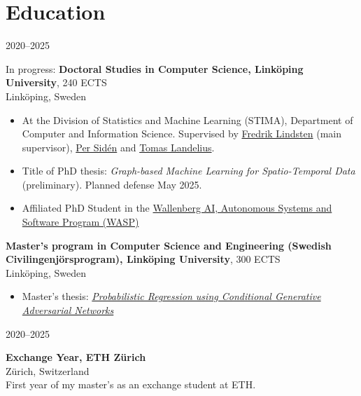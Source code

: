 \section*{Education}
\begin{labeling}{2020--2025}
    \item [2020--2025] In progress: \textbf{Doctoral Studies in Computer Science, Linköping University}, 240 ECTS\\
        {\footnotesize Linköping, Sweden}
        \begin{itemize}
            \item At the Division of Statistics and Machine Learning (STIMA), Department of Computer and Information Science. Supervised by \href{https://lindsten.netlify.app/}{Fredrik Lindsten} (main supervisor), \href{https://scholar.google.se/citations?user=0UomzRIAAAAJ}{Per Sidén} and \href{https://www.smhi.se/en/research/research-departments/meteorology/tomas-landelius-1.4817}{Tomas Landelius}.
            \item Title of PhD thesis: \textit{Graph-based Machine Learning for Spatio-Temporal Data} (preliminary).
            Planned defense May 2025.
            \item Affiliated PhD Student in the \href{https://wasp-sweden.org/}{Wallenberg AI, Autonomous Systems and Software Program (WASP)}
        \end{itemize}
    \item [2015--2020]
            \textbf{Master's program in Computer Science and Engineering (Swedish Civilingenjörsprogram), Linköping University}, 300 ECTS\\
        {\footnotesize Linköping, Sweden}
        \begin{itemize}
            \item Master's thesis: \href{http://urn.kb.se/resolve?urn=urn:nbn:se:liu:diva-166637}{\textit{Probabilistic Regression using Conditional Generative Adversarial Networks}}
        \end{itemize}
        \begin{labeling}{2020--2025}
        \item [2018--2019] \textbf{Exchange Year, ETH Zürich}\\
            {\footnotesize Zürich, Switzerland}\\
            First year of my master's as an exchange student at ETH.
        \end{labeling}
\end{labeling}
